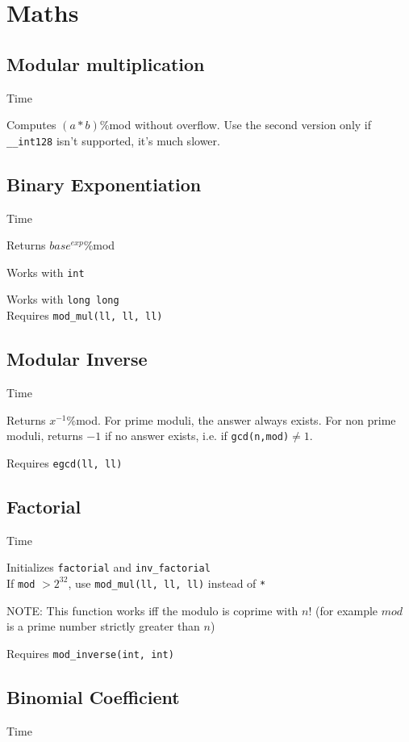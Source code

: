 \section{Maths}


\subsection{Modular multiplication}
 Time

Computes $(a * b)$\:\%\:mod without overflow. Use the second version only if \texttt{\_\_int128} isn't supported, it's much slower.


\subsection{Binary Exponentiation}
 Time

Returns ${base^{exp}}$\:\%\:mod

Works with \verb|int|

Works with \verb|long long| \\
Requires \verb|mod_mul(ll, ll, ll)|


\subsection{Modular Inverse}
 Time

Returns ${x^{-1}}$\:\%\:mod. For prime moduli, the answer always exists. For non prime moduli, returns $-1$ if no answer exists, i.e. if \verb|gcd(n,mod)|$ \neq 1$.

Requires \verb|egcd(ll, ll)|


\subsection{Factorial}
 Time

Initializes \verb|factorial| and \verb|inv_factorial| \\
If \verb|mod| $> 2^{32}$, use \verb|mod_mul(ll, ll, ll)| instead of \verb|*|

NOTE: This function works iff the modulo is coprime with $n!$
(for example $mod$ is a prime number strictly greater than $n$)

Requires \verb|mod_inverse(int, int)|


\subsection{Binomial Coefficient}
 Time

